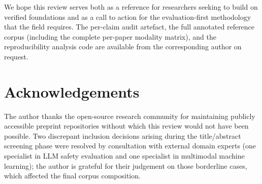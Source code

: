 We hope this review serves both as a reference for researchers seeking to build
on verified foundations and as a call to action for the evaluation-first methodology
that the field requires.
The per-claim audit artefact, the full annotated reference corpus (including the
complete per-paper modality matrix), and the reproducibility analysis code are
available from the corresponding author on request.

\section*{Acknowledgements}
The author thanks the open-source research community for maintaining publicly
accessible preprint repositories without which this review would not have been
possible.
Two discrepant inclusion decisions arising during the title/abstract screening
phase were resolved by consultation with external domain experts (one specialist
in LLM safety evaluation and one specialist in multimodal machine learning);
the author is grateful for their judgement on those borderline cases, which
affected the final corpus composition.
